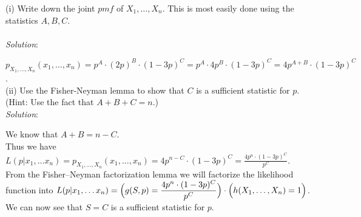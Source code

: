 \documentclass[12pt]{article}
\newcommand{\XB}{\color{black}}
\newcommand{\XV}{\color{violet}}
\begin{document}
(i) Write down the joint $ pmf $ of $ X_{1},\dots,X_{n} $. This is most easily done using the statistics $ A, B, C $. \\
\vspace{2.5mm} \\
\textit{Solution}:
\vspace{2.5mm}

\noindent 
$ p_{X_{1}, \dots, X_{n}}(x_{1}, \dots, x_{n}) = p^{A} \cdot (2p)^{B} \cdot (1 - 3p)^{C} = p^{A} \cdot 4p^{B} \cdot (1 - 3p)^{C} = 4p^{A + B} \cdot (1 - 3p)^{C} $. \\ 



(ii) Use the Fisher-Neyman lemma to show that $ C $ is a sufficient statistic for $ p $. \\
(Hint: Use the fact that $ A + B + C = n $.) 
\vspace{2.5mm} \\
\textit{Solution}:
\vspace{2.5mm}

\noindent 
We know that $ A + B = n - C $. \\ 

\noindent
Thus we have $ \displaystyle L(p | x_{1}, \dots x_{n}) = p_{X_{1}, \dots, X_{n}}(x_{1}, \dots, x_{n}) = 4p^{n - C} \cdot (1 - 3p)^{C} = \frac{4p^{n} \cdot (1 - 3p)^C}{p^{C}} $. \\

\noindent
From the Fisher–Neyman factorization lemma we will factorize the likelihood function into $ \displaystyle L(p | x_{1}, \dots x_{n}) = \Bigl( g(S, p) = \frac{4p^{n} \cdot (1 - 3p)^C}{p^{C}} \Bigr) \cdot \Bigl( h(X_{1}, \dots , X_{n}) = 1 \Bigr) $. \\

\noindent
We can now see that $ \displaystyle S = C $ is a sufficient statistic for $ p $. \\

\end{document}

